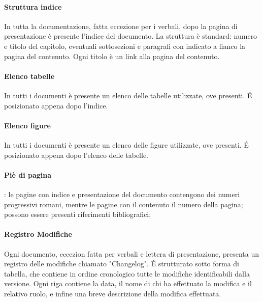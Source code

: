 \paragraph{Struttura indice ~\\}
In tutta la documentazione, fatta eccezione per i verbali, dopo la pagina di presentazione è presente l'indice del documento. La struttura è standard: numero e titolo del capitolo, eventuali sottosezioni e paragrafi con indicato a fianco la pagina del contenuto. Ogni titolo è un link alla pagina del contenuto. 

\paragraph{Elenco tabelle ~\\}
In tutti i documenti è presente un elenco delle tabelle utilizzate, ove presenti. \'E posizionato appena dopo l'indice.  

\paragraph{Elenco figure ~\\}
In tutti i documenti è presente un elenco delle figure utilizzate, ove presenti. \'E posizionato appena dopo l'elenco delle tabelle.

\paragraph{Piè di pagina}: le pagine con indice e presentazione del documento contengono dei numeri progressivi romani, mentre le pagine con il contenuto il numero della pagina; possono essere presenti riferimenti bibliografici;

\paragraph{Registro Modifiche ~\\}
Ogni documento, eccezion fatta per verbali e lettera di presentazione, presenta un registro delle modifiche chiamato "Changelog". \'E strutturato sotto forma di tabella, che contiene in ordine cronologico tutte le modifiche identificabili dalla versione.  Ogni riga contiene la data, il nome di chi ha effettuato la modifica e il relativo ruolo, e infine una breve descrizione della modifica effettuata.

